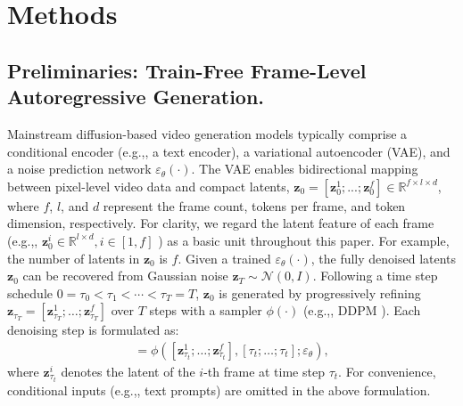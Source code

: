 \documentclass{llmxive}
\providecommand{\eg}{e.g.,\xspace}
\begin{document}
\section{Methods}
\label{sec_method}



\subsection{Preliminaries: Train-Free Frame-Level Autoregressive Generation.}
\label{sec_3_1}
Mainstream diffusion-based video generation models typically comprise a conditional encoder (\eg, a text encoder), a variational autoencoder (VAE), and a noise prediction network $\varepsilon_\theta(\cdot)$. 
The VAE enables bidirectional mapping between pixel-level video data and compact latents, $\mathbf{z}_0 = [\mathbf{z}_0^1; ...; \mathbf{z}_0^f] \in \mathbb{R}^{f \times l \times d}$, where $f$, $l$, and $d$ represent the frame count, tokens per frame, and token dimension, respectively.
For clarity, we regard the latent feature of each frame (\eg, $\mathbf{z}_0^i \in \mathbb{R}^{l \times d}, i \in [1,f]$ ) as a basic unit throughout this paper. For example, the  number of latents in $\mathbf{z}_0$ is $f$.
Given a trained $\varepsilon_\theta(\cdot)$, the fully denoised latents $\mathbf{z}_0$ can be recovered from Gaussian noise $\mathbf{z}_T \sim \mathcal{N}(0, I)$. 
Following a time step schedule $0 = \tau_0 < \tau_1 < \cdots < \tau_T = T$, $\mathbf{z}_0$ is generated by progressively refining $\mathbf{z}_{\tau_T} = [\mathbf{z}_{\tau_T}^1; \ldots; \mathbf{z}_{\tau_T}^f]$ over $T$ steps with a sampler $\phi(\cdot)$ (\eg, DDPM \cite{ho2020denoising}).
Each denoising step is formulated as:
\begin{align}
  [\mathbf{z}_{\tau_{t-1}}^1; \ldots; \mathbf{z}_{\tau_{t-1}}^f] = \phi([\mathbf{z}_{\tau_t}^1; \ldots; \mathbf{z}_{\tau_t}^f], [\tau_t; \ldots; \tau_t]; \varepsilon_\theta),
  \label{eq:fifo}
\end{align}
where $\mathbf{z}_{\tau_t}^i$ denotes the latent of the $i$-th frame at time step $\tau_t$. For convenience, conditional inputs (\eg, text prompts) are omitted in the above formulation.
\end{document}

